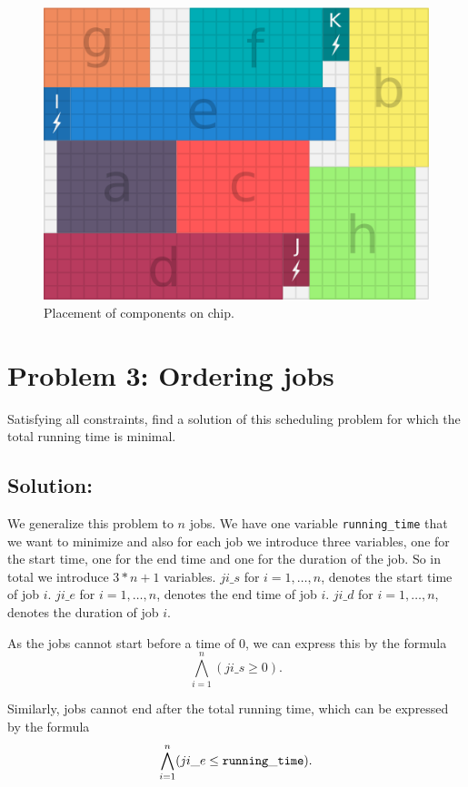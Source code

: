 \documentclass[a4paper]{article}
\begin{document}
	\begin{figure}[H]
		\centering
			\includegraphics[scale=0.7]{power-grid-3.png}
		\caption{Placement of components on chip.}
	\end{figure}
	
	\section*{Problem 3: Ordering jobs}
	Satisfying all constraints, find a solution of this scheduling problem for which the total running time is minimal.


	\subsection*{Solution:}
	We generalize this problem to $n$ jobs. We have one variable {\tt running\_time} that we want to minimize and also for each job we introduce three variables, one for the start time, one for the end time and one for the duration of the job. So in total we introduce $3*n + 1$ variables. $ji\_s$ for $i = 1,\ldots,n$, denotes the start time of job $i$. $ji\_e$ for $i = 1,\ldots,n$, denotes the end time of job $i$. $ji\_d$ for $i = 1,\ldots,n$, denotes the duration of job $i$.
	
	As the jobs cannot start before a time of 0, we can express this by the formula
\[ \bigwedge_{i=1}^n (ji\_s \geq 0).\]

	Similarly, jobs cannot end after the total running time, which can be expressed by the formula
\[ \bigwedge_{i=1}^n (ji\_e \leq {\tt running\_time}).\]
\end{document}
